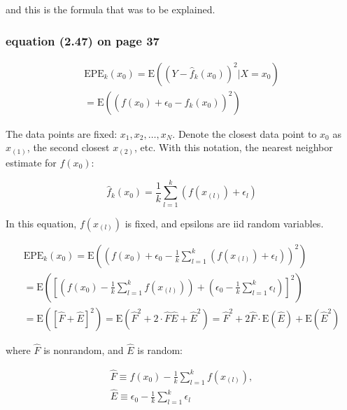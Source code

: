 \documentclass{article}
\begin{document}
and this is the formula that was to be explained.


\subsubsection{equation (2.47) on page 37}

\begin{equation}
  \begin{split}
    \text{EPE}_k(x_0) = \text{E}\left((Y - \hat{f}_k(x_0))^2 | X=x_0\right)\\
    = \text{E}\left((f(x_0) + \epsilon_0 - \hat{f}_k(x_0))^2\right)
  \end{split}
\end{equation}

The data points are fixed: {$x_1, x_2, \dots, x_N$}. Denote the closest data point to $x_0$ as $x_{(1)}$, the second closest $x_{(2)}$, etc. With this notation, the nearest neighbor estimate for $f(x_0)$:

\begin{equation}
    \hat{f}_k(x_0) = \frac 1k \sum_{l=1}^{k}(f(x_{(l)}) + \epsilon_l)
\end{equation}

In this equation, $f(x_{(l)})$ is fixed, and epsilons are iid random variables.

\begin{equation}
  \begin{split}
    \text{EPE}_k(x_0) = \text{E}\left( \left(f(x_0) + \epsilon_0 - \frac 1k \sum_{l=1}^{k}(f(x_{(l)}) + \epsilon_l)\right)^2\right)\\
    = \text{E}\left( \left[ \left( f(x_0) - \frac 1k \sum_{l=1}^{k}f(x_{(l)})\right) + \left( \epsilon_0 - \frac 1k \sum_{l=1}^{k}\epsilon_l \right) \right]^2 \right)\\
    = \text{E} \left([\hat{F} + \hat{E}]^2\right) = \text{E} \left(\hat{F}^2 + 2\cdot \hat{F} \hat{E} + \hat{E}^2\right) = \hat{F}^2 + 2\hat{F}\cdot\text{E}(\hat{E}) + \text{E}(\hat{E}^2)
  \end{split}
\end{equation}

where $\hat{F}$ is nonrandom, and $\hat{E}$ is random:

\begin{equation}
  \begin{split}
    \hat{F} \equiv f(x_0) - \frac 1k \sum_{l=1}^{k}f(x_{(l)}),\\
    \hat{E} \equiv \epsilon_0 - \frac 1k \sum_{l=1}^{k}\epsilon_l
  \end{split}
\end{equation}
\end{document}
